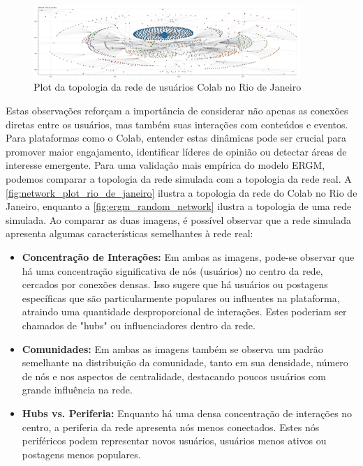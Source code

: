 \begin{figure}[!htb]
	\caption{Plot da topologia da rede de usuários Colab no Rio de Janeiro}
	\label{fig:network_plot_rio_de_janeiro}
	\centering
	\includegraphics[width=0.9\textwidth]{images/network_plot_rio_de_janeiro.png}
	\fautor
\end{figure}

Estas observações reforçam a importância de considerar não apenas as conexões diretas entre os usuários, mas também suas interações com conteúdos e eventos. Para plataformas como o Colab, entender estas dinâmicas pode ser crucial para promover maior engajamento, identificar líderes de opinião ou detectar áreas de interesse emergente. Para uma validação mais empírica do modelo ERGM, podemos comparar a topologia da rede simulada com a topologia da rede real. A \autoref{fig:network_plot_rio_de_janeiro} ilustra a topologia da rede do Colab no Rio de Janeiro, enquanto a \autoref{fig:ergm_random_network} ilustra a topologia de uma rede simulada. Ao comparar as duas imagens, é possível observar que a rede simulada apresenta algumas características semelhantes à rede real:

\begin{itemize}
	\item \textbf{Concentração de Interações:} Em ambas as imagens, pode-se observar que há uma concentração significativa de nós (usuários) no centro da rede, cercados por conexões densas. Isso sugere que há usuários ou postagens específicas que são particularmente populares ou influentes na plataforma, atraindo uma quantidade desproporcional de interações. Estes poderiam ser chamados de "hubs" ou influenciadores dentro da rede.
	\item \textbf{Comunidades:} Em ambas as imagens também se observa um padrão semelhante na distribuição da comunidade, tanto em sua densidade, número de nós e nos aspectos de centralidade, destacando poucos usuários com grande influência na rede.
	\item \textbf{Hubs vs. Periferia:} Enquanto há uma densa concentração de interações no centro, a periferia da rede apresenta nós menos conectados. Estes nós periféricos podem representar novos usuários, usuários menos ativos ou postagens menos populares.
\end{itemize}

